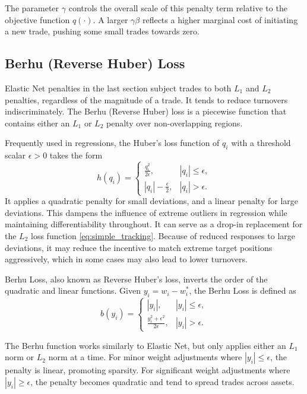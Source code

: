 \documentclass[11pt, letterpaper]{article}
\begin{document}
The parameter $\gamma$ controls the overall scale of this penalty term relative to the objective function $q(\cdot)$.  A larger
$\gamma\beta$ reflects a higher marginal cost of initiating a new trade, pushing some small trades towards zero.

\subsection{Berhu (Reverse Huber) Loss}
Elastic Net penalties in the last section subject trades to both $L_1$ and $L_2$ penalties, regardless of the magnitude of a
trade. It tends to reduce turnovers indiscriminately. The Berhu (Reverse Huber) loss \cite{owen2007robust} is a piecewise
function that contains either an $L_1$ or $L_2$ penalty over non-overlapping regions.

Frequently used in regressions, the Huber's loss function of $q_i$ with a threshold scalar $\epsilon > 0$ takes the form
\begin{equation}
  h(q_i) = \begin{cases}
    \frac{q_i^2}{2\epsilon}, & |q_i| \leq \epsilon, \\
    |q_i| - \frac{\epsilon}{2}, & |q_i| > \epsilon.
  \end{cases}
\end{equation}
It applies a quadratic penalty for small deviations, and a linear penalty for large deviations. This dampens the influence of
extreme outliers in regression while maintaining differentiability throughout. It can serve as a drop-in replacement for the
$L_2$ loss function \eqref{eq:simple_tracking}. Because of reduced responses to large deviations, it may reduce the incentive to
match extreme target positions aggressively, which in some cases may also lead to lower turnovers.

Berhu Loss, also known as Reverse Huber's loss, inverts the order of the quadratic and linear functions. Given
$y_i = w_i - w_i^*$, the Berhu Loss is defined as
\begin{equation}
  \label{berhu_func}
  b(y_i) = \begin{cases}
    |y_i|, & |y_i| \leq \epsilon, \\
    \frac{y_i^2 + \epsilon^2}{2\epsilon}, & |y_i| > \epsilon.
  \end{cases}
\end{equation}

The Berhu function works similarly to Elastic Net, but only applies either an $L_1$ norm or $L_2$ norm at a time. For minor
weight adjustments where $|y_i| \leq \epsilon$, the penalty is linear, promoting sparsity. For significant weight adjustments
where $|y_i| \geq \epsilon$, the penalty becomes quadratic and tend to spread trades across assets.
\end{document}
